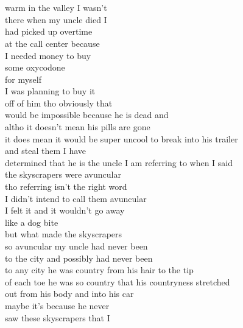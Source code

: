 \section*{\-\ \hspace*{\fill}  \thepage}
\label{sec:The_Uncle_Poem_cont}
\hspace{0pt}
\vfill
\begin{flushleft}
\begin{paracol}{3} %
warm in the valley I wasn’t\\
there when my uncle died I\\
had picked up overtime\\
at the call center because\\
I needed money to buy\\
some oxycodone\\
for myself\\
I was planning to buy it\\
off of him tho obviously that\\
would be impossible because he is dead and\\
altho it doesn’t mean his pills are gone\\
it does mean it would be super
uncool to break into his trailer\\
and steal them I have\\
determined that he is the uncle I am referring to when I said\\
the skyscrapers were avuncular\\
tho referring isn’t the right word\\
I didn’t intend to call them avuncular\\
I felt it and it wouldn’t go away\\
like a dog bite\\
\switchcolumn[1]
but what made the skyscrapers\\
so avuncular my uncle had never been\\
to the city and possibly had never been\\
to any city he was country from his hair to the tip\\
of each toe he was so country that his countryness stretched\\ 
out from his body and into his car\\
maybe it’s because he never\\
saw these skyscrapers that I\\

\end{paracol}
\end{flushleft}
